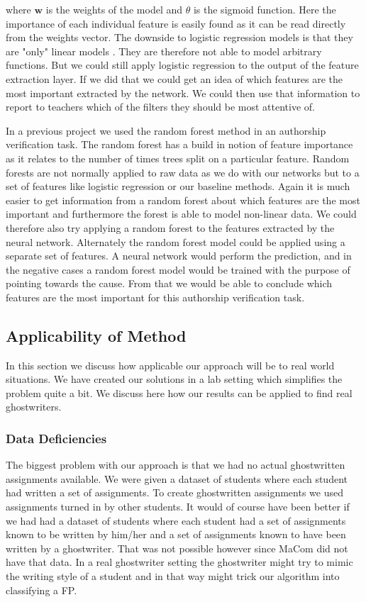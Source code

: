 where $\mathbf{w}$ is the weights of the model and $\theta$ is the sigmoid
function. Here the importance of each individual feature is easily
found as it can be read directly from the weights vector. The downside
to logistic regression models is that they are "only" linear models
\citep{Abu-Mostafa:2012:LD:2207825}. They are therefore not able to model
arbitrary functions. But we could still apply logistic regression to the output
of the feature extraction layer. If we did that we could get an idea of which
features are the most important extracted by the network. We could then use
that information to report to teachers which of the filters they should be most
attentive of.

In a previous project \citep{US} we used the random forest method in an
authorship verification task. The random forest has a build in notion of feature
importance as it relates to the number of times trees split on a particular
feature. Random forests are not normally applied to raw data as we do with our
networks but to a set of features like logistic regression or our baseline
methods. Again it is much easier to get information from a random forest about
which features are the most important and furthermore the forest is able to
model non-linear data. We could therefore also try applying a random forest to
the features extracted by the neural network. Alternately the random forest
model could be applied using a separate set of features. A neural network would
perform the prediction, and in the negative cases a random forest model would
be trained with the purpose of pointing towards the cause. From that we would
be able to conclude which features are the most important for this authorship
verification task.


\subsection{Applicability of Method}\label{subsec:applicability_of_method}

In this section we discuss how applicable our approach will be to real
world situations. We have created our solutions in a lab setting which
simplifies the problem quite a bit. We discuss here how our results can be
applied to find real ghostwriters.


\subsubsection{Data Deficiencies}

The biggest problem with our approach is that we had no actual ghostwritten
assignments available. We were given a dataset of students where each student
had written a set of assignments. To create ghostwritten assignments we used
assignments turned in by other students. It would of course have been better if
we had had a dataset of students where each student had a set of assignments
known to be written by him/her and a set of assignments known to have been
written by a ghostwriter. That was not possible however since MaCom did not have
that data. In a real ghostwriter setting the ghostwriter might try to mimic
the writing style of a student and in that way might trick our algorithm into
classifying a \gls{FP}.

